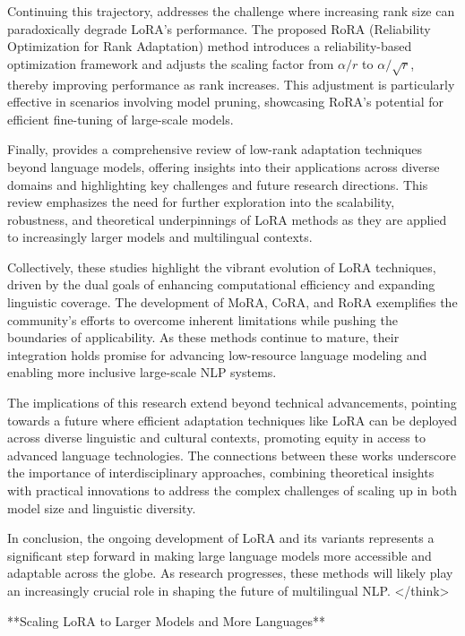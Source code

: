 \documentclass[conference]{IEEEtran}
\begin{document}
Continuing this trajectory, \cite{d} addresses the challenge where increasing rank size can paradoxically degrade LoRA's performance. The proposed RoRA (Reliability Optimization for Rank Adaptation) method introduces a reliability-based optimization framework and adjusts the scaling factor from $\alpha/r$ to $\alpha/\sqrt{r}$, thereby improving performance as rank increases. This adjustment is particularly effective in scenarios involving model pruning, showcasing RoRA's potential for efficient fine-tuning of large-scale models.

Finally, \cite{e} provides a comprehensive review of low-rank adaptation techniques beyond language models, offering insights into their applications across diverse domains and highlighting key challenges and future research directions. This review emphasizes the need for further exploration into the scalability, robustness, and theoretical underpinnings of LoRA methods as they are applied to increasingly larger models and multilingual contexts.

Collectively, these studies highlight the vibrant evolution of LoRA techniques, driven by the dual goals of enhancing computational efficiency and expanding linguistic coverage. The development of MoRA, CoRA, and RoRA exemplifies the community's efforts to overcome inherent limitations while pushing the boundaries of applicability. As these methods continue to mature, their integration holds promise for advancing low-resource language modeling and enabling more inclusive large-scale NLP systems.

The implications of this research extend beyond technical advancements, pointing towards a future where efficient adaptation techniques like LoRA can be deployed across diverse linguistic and cultural contexts, promoting equity in access to advanced language technologies. The connections between these works underscore the importance of interdisciplinary approaches, combining theoretical insights with practical innovations to address the complex challenges of scaling up in both model size and linguistic diversity.

In conclusion, the ongoing development of LoRA and its variants represents a significant step forward in making large language models more accessible and adaptable across the globe. As research progresses, these methods will likely play an increasingly crucial role in shaping the future of multilingual NLP.
</think>

**Scaling LoRA to Larger Models and More Languages**
\end{document}
